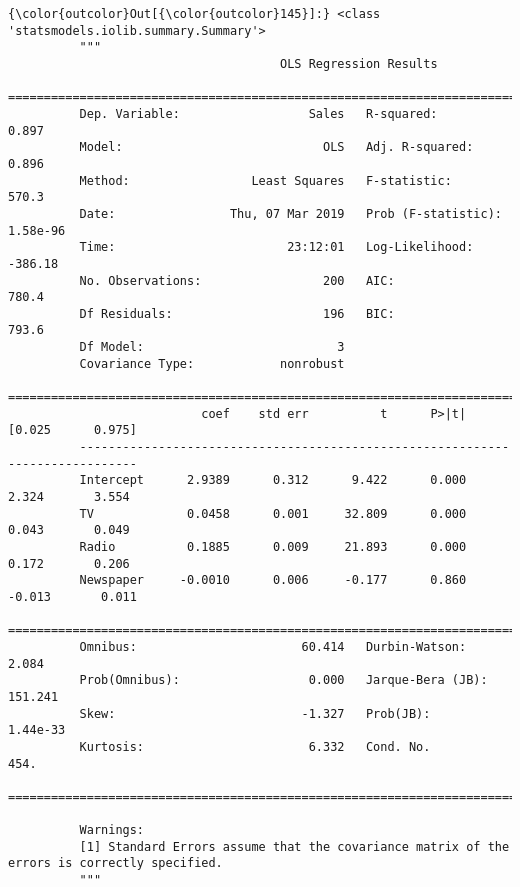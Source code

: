 \documentclass[11pt]{article}
\begin{document}
\begin{Verbatim}[commandchars=\\\{\}]
{\color{outcolor}Out[{\color{outcolor}145}]:} <class 'statsmodels.iolib.summary.Summary'>
          """
                                      OLS Regression Results                            
          ==============================================================================
          Dep. Variable:                  Sales   R-squared:                       0.897
          Model:                            OLS   Adj. R-squared:                  0.896
          Method:                 Least Squares   F-statistic:                     570.3
          Date:                Thu, 07 Mar 2019   Prob (F-statistic):           1.58e-96
          Time:                        23:12:01   Log-Likelihood:                -386.18
          No. Observations:                 200   AIC:                             780.4
          Df Residuals:                     196   BIC:                             793.6
          Df Model:                           3                                         
          Covariance Type:            nonrobust                                         
          ==============================================================================
                           coef    std err          t      P>|t|      [0.025      0.975]
          ------------------------------------------------------------------------------
          Intercept      2.9389      0.312      9.422      0.000       2.324       3.554
          TV             0.0458      0.001     32.809      0.000       0.043       0.049
          Radio          0.1885      0.009     21.893      0.000       0.172       0.206
          Newspaper     -0.0010      0.006     -0.177      0.860      -0.013       0.011
          ==============================================================================
          Omnibus:                       60.414   Durbin-Watson:                   2.084
          Prob(Omnibus):                  0.000   Jarque-Bera (JB):              151.241
          Skew:                          -1.327   Prob(JB):                     1.44e-33
          Kurtosis:                       6.332   Cond. No.                         454.
          ==============================================================================
          
          Warnings:
          [1] Standard Errors assume that the covariance matrix of the errors is correctly specified.
          """
\end{Verbatim}
            
\end{document}
